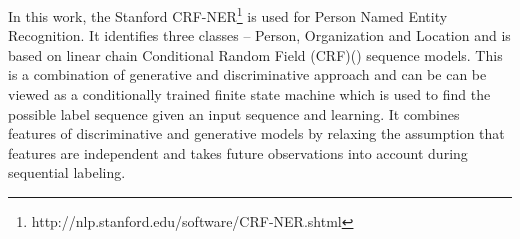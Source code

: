 In this work, the Stanford CRF-NER\footnote{http://nlp.stanford.edu/software/CRF-NER.shtml} is used for Person Named Entity Recognition. It identifies three classes -- Person, Organization and Location and is based on linear chain Conditional Random Field (CRF)(\cite{mccallum2003early, finkel2005incorporating, sutton2011introduction}) sequence models. This is a combination of generative and discriminative approach and can be can be viewed as a conditionally trained finite state machine which is used to find the possible label sequence given an input sequence and learning. It combines features of discriminative and generative models by relaxing the assumption that features are independent and takes future observations into account during sequential labeling. 










